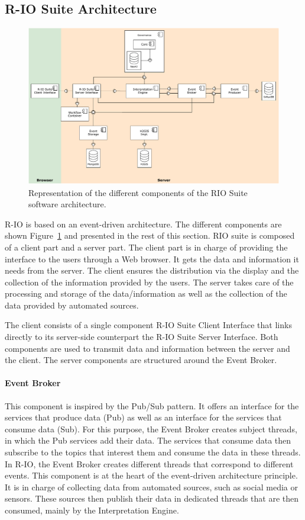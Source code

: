 \subsection{R-IO Suite Architecture}
\begin{figure}[htb]
    \centering
    \includegraphics[width=\textwidth]{figures/chap-5/RIO-archi.pdf}
    \caption{Representation of the different components of the RIO Suite software architecture.}
    \label{system:rio-archi}
\end{figure}

R-IO is based on an event-driven architecture.
The different components are shown Figure~\ref{system:rio-archi} and presented in the rest of this section.
RIO suite is composed of a client part and a server part.
The client part is in charge of providing the interface to the users through a Web browser.
It gets the data and information it needs from the server.
The client ensures the distribution via the display and the collection of the information provided by the users.
The server takes care of the processing and storage of the data/information as well as the collection of the data provided by automated sources.

The client consists of a single component R-IO Suite Client Interface that links directly to its server-side counterpart the R-IO Suite Server Interface.
Both components are used to transmit data and information between the server and the client.
The server components are structured around the Event Broker.
\paragraph{Event Broker}
This component is inspired by the Pub/Sub pattern.
It offers an interface for the services that produce data (Pub) as well as an interface for the services that consume data (Sub).
For this purpose, the Event Broker creates subject threads, in which the Pub services add their data.
The services that consume data then subscribe to the topics that interest them and consume the data in these threads.
In R-IO, the Event Broker creates different threads that correspond to different events.
This component is at the heart of the event-driven architecture principle.
It is in charge of collecting data from automated sources, such as social media or sensors.
These sources then publish their data in dedicated threads that are then consumed, mainly by the Interpretation Engine.
